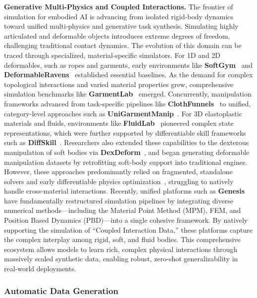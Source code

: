 \documentclass[acmsmall,screen,review,anonymous]{acmart}
\begin{document}
\textbf{Generative Multi-Physics and Coupled Interactions.} The frontier of simulation for embodied AI is advancing from isolated rigid-body dynamics toward unified multi-physics and generative task synthesis. Simulating highly articulated and deformable objects introduces extreme degrees of freedom, challenging traditional contact dynamics. The evolution of this domain can be traced through specialized, material-specific simulators. For 1D and 2D deformables, such as ropes and garments, early environments like \textbf{SoftGym}~\cite{lin2021softgym} and \textbf{DeformableRavens}~\cite{seita2021deformableravens} established essential baselines. As the demand for complex topological interactions and varied material properties grew, comprehensive simulation benchmarks like \textbf{GarmentLab}~\cite{lu2024garmentlab} emerged. Concurrently, manipulation frameworks advanced from task-specific pipelines like \textbf{ClothFunnels}~\cite{canberk2022clothfunnels} to unified, category-level approaches such as \textbf{UniGarmentManip}~\cite{wu2024unigarmentmanip}.
For 3D elastoplastic materials and fluids, environments like \textbf{FluidLab}~\cite{xian2023fluidlab} pioneered complex state representations, which were further supported by differentiable skill frameworks such as \textbf{DiffSkill}~\cite{lin2022diffskill}. Researchers also extended these capabilities to the dexterous manipulation of soft bodies via \textbf{DexDeform}~\cite{li2023dexdeform}, and began generating deformable manipulation datasets by retrofitting soft-body support into traditional engines.
However, these approaches predominantly relied on fragmented, standalone solvers and early differentiable physics optimization~\cite{hu2020difftaichi}, struggling to natively handle cross-material interactions. Recently, unified platforms such as \textbf{Genesis}~\cite{genesis2024} have fundamentally restructured simulation pipelines by integrating diverse numerical methods---including the Material Point Method (MPM), FEM, and Position Based Dynamics (PBD)---into a single cohesive framework. By natively supporting the simulation of ``Coupled Interaction Data,'' these platforms capture the complex interplay among rigid, soft, and fluid bodies. This comprehensive ecosystem allows models to learn rich, complex physical interactions through massively scaled synthetic data, enabling robust, zero-shot generalizability in real-world deployments.

\subsubsection{Automatic Data Generation}
\end{document}
